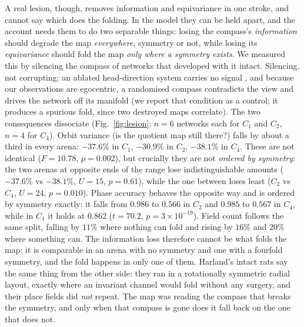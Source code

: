 A real lesion, though, removes information and equivariance in one stroke, and cannot say which does the
folding. In the model they can be held apart, and the account needs them to do two separable things:
losing the compass's \emph{information} should degrade the map \emph{everywhere}, symmetry or not,
while losing its \emph{equivariance} should fold the map \emph{only where a symmetry exists}. We
measured this by silencing the compass of networks that developed with it intact. Silencing, not
corrupting: an ablated head-direction system carries no signal \citep{bassett2007}, and because our
observations are egocentric, a randomised compass contradicts the view and drives the network off its
manifold (we report that condition as a control; it produces a spurious fold, since two destroyed maps
correlate). The two consequences dissociate (Fig.~\ref{fig:lesion}; $n = 6$ networks each for $C_1$
and $C_2$, $n = 4$ for $C_4$). Orbit variance (is the quotient map still there?) falls by about a
third in every arena: $-37.6\%$ in $C_1$, $-30.9\%$ in $C_2$, $-38.1\%$ in $C_4$. These are not
identical ($F = 10.78$, $p = 0.002$), but crucially they are not \emph{ordered by symmetry}: the two
arenas at opposite ends of the range lose indistinguishable amounts ($-37.6\%$ vs $-38.1\%$, $U = 15$,
$p = 0.61$), while the one between loses least ($C_2$ vs $C_4$, $U = 24$, $p = 0.010$). Phase accuracy
behaves the opposite way and is ordered by symmetry exactly: it falls from $0.986$ to $0.566$ in $C_2$
and $0.985$ to $0.567$ in $C_4$, while in $C_1$ it holds at $0.862$ ($t = 70.2$, $p = 3\times10^{-19}$).
Field count follows the same split, falling by $11\%$ where nothing can fold and rising by $16\%$ and
$20\%$ where something can. The information loss therefore cannot be what folds the map: it is
comparable in an arena with no symmetry and one with a fourfold symmetry, and the fold happens in only
one of them. Harland's intact rats say the same thing from the other side: they ran in a rotationally
symmetric radial layout, exactly where an invariant channel would fold without any surgery, and their
place fields did \emph{not} repeat. The map was reading the compass that breaks the symmetry, and only
when that compass is gone does it fall back on the one that does not.

